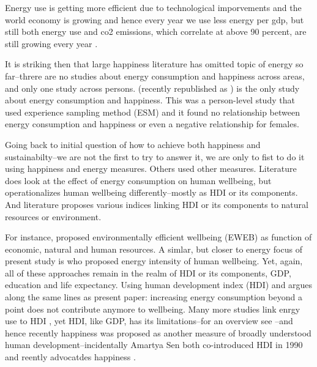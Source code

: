 \documentclass[10pt, letterpaper]{article}
\begin{document}
\begin{spacing}{1.4}
Energy use is getting more efficient due to technological imporvements and the
world economy is growing and hence every year we use less energy per gdp, but
still both energy use and co2 emissions, which correlate at above 90 percent,
are still growing every year \citep{iea14}. 


It is striking then that large happiness literature has omitted topic of energy
so far--threre are no studies about energy consumption and happiness across
areas, and only one study across persons.  \citet{graef81} (recently republished
as \citet{csikszentmihalyi14}) is the  only study about energy consumption and
happiness. This was a person-level study that used experience
sampling method (ESM) and it found no relationship between energy consumption
and happiness or even a negative relationship for females. 


Going back to initial question of how to achieve both happiness and
sustainabilty--we are not the first to try to answer it, we are only to fist to
do it using happiness and energy measures. Others used other measures.
Literature does look at the effect of energy consumption on human
wellbeing, but operationalizes human wellbeing differently--mostly as HDI or its
components. And literature proposes various indices linking HDI or its
components to natural resources or environment.

For instance, \citet{dietz09} proposed environmentally efficient wellbeing
(EWEB) as function of economic, natural and human resources. A simlar, but
closer to energy focus of present study is \citet{jorgenson14B} who proposed
energy intensity of human wellbeing. Yet, again, all of these approaches remain
in the realm of HDI or its components, GDP, education and life expectancy. 
 Using human development index (HDI) \citep{steinberger10} and argues along the
 same lines as present paper: increasing energy consumption beyond a point does
 not contribute anymore to wellbeing.  Many more studies link enrgy use to HDI
 \citep[e.g.]{dias06}, yet HDI, like  GDP, has its limitations--for an overview
 see \citet{klugman11}--and hence  recently happiness was proposed as another
 measure of broadly understood human  development--incidentally Amartya Sen both
 co-introduced HDI in 1990 and  reently advocatdes happiness \citep{stiglitz09al}. 


\end{spacing}
\end{document}
